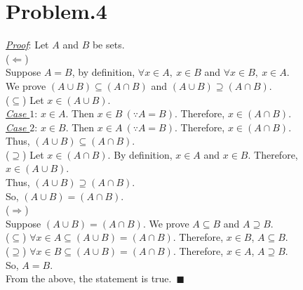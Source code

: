 \documentclass[12pt]{article}
\begin{document}
\section*{Problem.4}
\underline{\textit{Proof}}: Let $A$ and $B$ be sets.\\[1em]
($\Leftarrow$)\\[1em]
Suppose $A = B$, by definition, $\forall x \in A,~ x \in B$ and $\forall x \in B,~ x \in A$.\\
We prove $(A \cup B) \subseteq (A \cap B)$ and $(A \cup B) \supseteq (A \cap B)$.\\[1em]
($\subseteq$) Let $x \in (A \cup B)$.\\
\underline{\textit{Case $1$}}: $x \in A$. Then $x \in B ~(\because A = B)$. Therefore, $x \in (A \cap B)$.\\
\underline{\textit{Case $2$}}: $x \in B$. Then $x \in A ~(\because A = B)$. Therefore, $x \in (A \cap B)$.\\
Thus, $(A \cup B) \subseteq (A \cap B)$.\\[1em]
($\supseteq$) Let $x \in (A \cap B)$. By definition, $x \in A$ and $x \in B$. Therefore, $x \in (A \cup B)$.\\
Thus, $(A \cup B) \supseteq (A \cap B)$.\\[1em]
So, $(A \cup B) = (A \cap B)$.\\[1em]
($\Rightarrow$)\\[1em]
Suppose $(A \cup B) = (A \cap B)$. We prove $A \subseteq B$ and $A \supseteq B$.\\[1em]
($\subseteq$) $\forall x \in A \subseteq (A \cup B) = (A \cap B)$. Therefore, $x \in B$, $A \subseteq B$.\\[1em]
($\supseteq$) $\forall x \in B \subseteq (A \cup B) = (A \cap B)$. Therefore, $x \in A$, $A \supseteq B$.\\[1em]
So, $A = B$.\\[1em]
From the above, the statement is true.~$\blacksquare$
\end{document}
